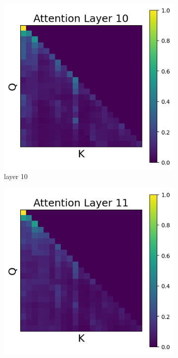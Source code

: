 \documentclass[11pt]{article}
\begin{document}
\begin{figure}[t]
    \begin{subfigure}[t]{0.24\textwidth}
    \centering
    \includegraphics[width=1.4\columnwidth]{figures/intervention2/layer_10.png}
    \caption{layer 10}
  \end{subfigure}\hfill
    \begin{subfigure}[t]{0.24\textwidth}
    \centering
    \includegraphics[width=1.4\columnwidth]{figures/intervention2/layer_11.png}

\end{subfigure}
\end{figure}
\end{document}
